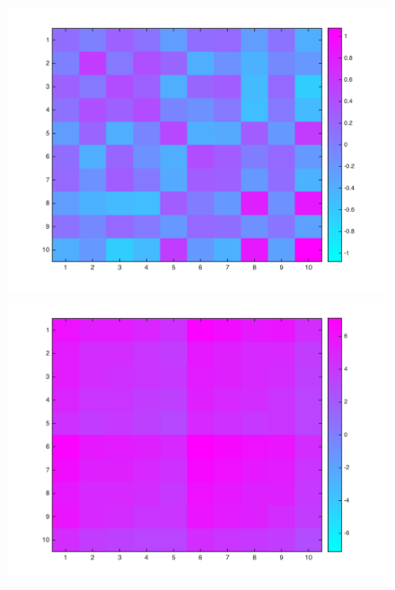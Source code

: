\documentclass{article}
\begin{document}
\begin{figure}[htbp]
  \centering
  \begin{minipage}{0.24\textwidth}
    \centering
    \includegraphics[width=1\textwidth]{../yanyu_code/plots/sym}
  \end{minipage}
  \hfill
  \begin{minipage}{0.24\textwidth}
    \centering
    \includegraphics[width=1\textwidth]{../yanyu_code/plots/asym}
  \end{minipage}
  \hfill
  \begin{minipage}{0.24\textwidth}
    \centering

\end{minipage}
\end{figure}
\end{document}
